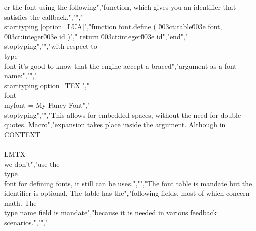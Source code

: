 er the font using the following","function, which gives you an identifier that satisfies the callback.","","\\starttyping [option=LUA]","function font.define ( \u003ct:table\u003e font, \u003ct:integer\u003e id )","    return \u003ct:integer\u003e id","end","\\stoptyping","","with respect to \\type {\\font} it's good to know that the engine accept a braced","argument as a font name:","","\\starttyping[option=TEX]","\\font\\myfont = {My Fancy Font}","\\stoptyping","","This allows for embedded spaces, without the need for double quotes. Macro","expansion takes place inside the argument. Although in \\CONTEXT\\ \\LMTX\\ we don't","use the \\type {\\font} for defining fonts, it still can be uses.","","The font table is mandate but the identifier is optional. The table has the","following fields, most of which concern math. The \\type {name} field is mandate","because it is needed in various feedback scenarios.","","%